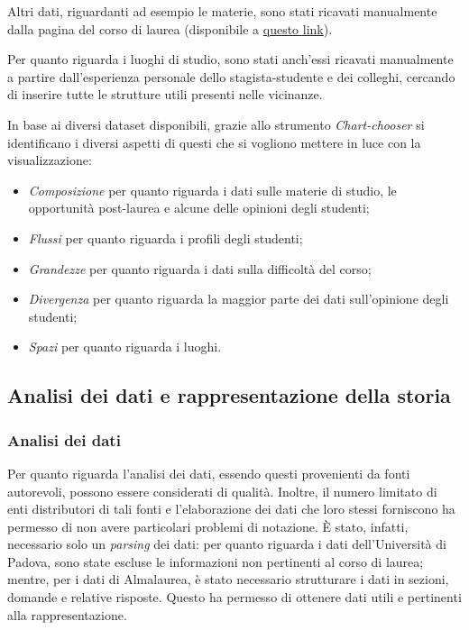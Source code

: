 Altri dati, riguardanti ad esempio le materie, sono stati ricavati manualmente dalla pagina del corso di laurea (disponibile a \href{https://www.didattica.unipd.it/off/2023/LT/SC/SC1167}{questo link}).

Per quanto riguarda i luoghi di studio, sono stati anch'essi ricavati manualmente a partire dall'esperienza personale dello stagista-studente e dei colleghi, cercando di inserire tutte le strutture utili presenti nelle vicinanze.

\bigskip
\noindent In base ai diversi dataset disponibili, grazie allo strumento \emph{Chart-chooser} si identificano i diversi aspetti di questi che si vogliono mettere in luce con la visualizzazione:
\begin{itemize}
    \item \emph{Composizione} per quanto riguarda i dati sulle materie di studio, le opportunità post-laurea e alcune delle opinioni degli studenti;
    \item \emph{Flussi} per quanto riguarda i profili degli studenti;
    \item \emph{Grandezze} per quanto riguarda i dati sulla difficoltà del corso;
    \item \emph{Divergenza} per quanto riguarda la maggior parte dei dati sull'opinione degli studenti;
    \item \emph{Spazi} per quanto riguarda i luoghi.
\end{itemize}

\subsection{Analisi dei dati e rappresentazione della storia}
\subsubsection{Analisi dei dati}
Per quanto riguarda l'analisi dei dati, essendo questi provenienti da fonti autorevoli, possono essere considerati di qualità. Inoltre, il numero limitato di enti distributori di tali fonti e l'elaborazione 
dei dati che loro stessi forniscono ha permesso di non avere particolari problemi di notazione. 
È stato, infatti, necessario solo un \emph{parsing} dei dati: per quanto riguarda i dati dell'Università di Padova, sono state escluse le informazioni non pertinenti al corso di laurea;
mentre, per i dati di Almalaurea, è stato necessario strutturare i dati in sezioni, domande e relative risposte. 
Questo ha permesso di ottenere dati utili e pertinenti alla rappresentazione.

